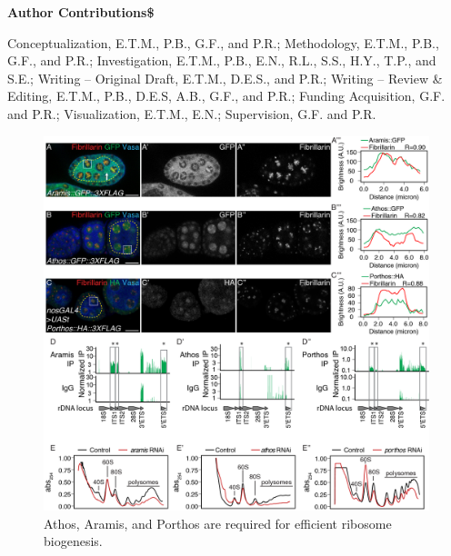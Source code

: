 \documentclass[12pt,oneside]{reedthesis}
\begin{document}
\textbf{Author Contributions\$}

Conceptualization, E.T.M., P.B., G.F., and P.R.; Methodology, E.T.M.,
P.B., G.F., and P.R.; Investigation, E.T.M., P.B., E.N., R.L., S.S.,
H.Y., T.P., and S.E.; Writing -- Original Draft, E.T.M., D.E.S., and
P.R.; Writing -- Review \& Editing, E.T.M., P.B., D.E.S, A.B., G.F., and
P.R.; Funding Acquisition, G.F. and P.R.; Visualization, E.T.M., E.N.;
Supervision, G.F. and P.R.
\begin{figure}

{\centering \includegraphics[width=6.5 in,height=8.9375 in]{./figure/Ribosome Biogenesis/Ribosome Biogenesis 2} 

}

\caption[Athos, Aramis, and Porthos are required for efficient ribosome biogenesis.]{Athos, Aramis, and Porthos are required for efficient ribosome biogenesis.}\label{fig:unnamed-chunk-8}
\end{figure}
\textbf{\hfill\break
}
\end{document}
